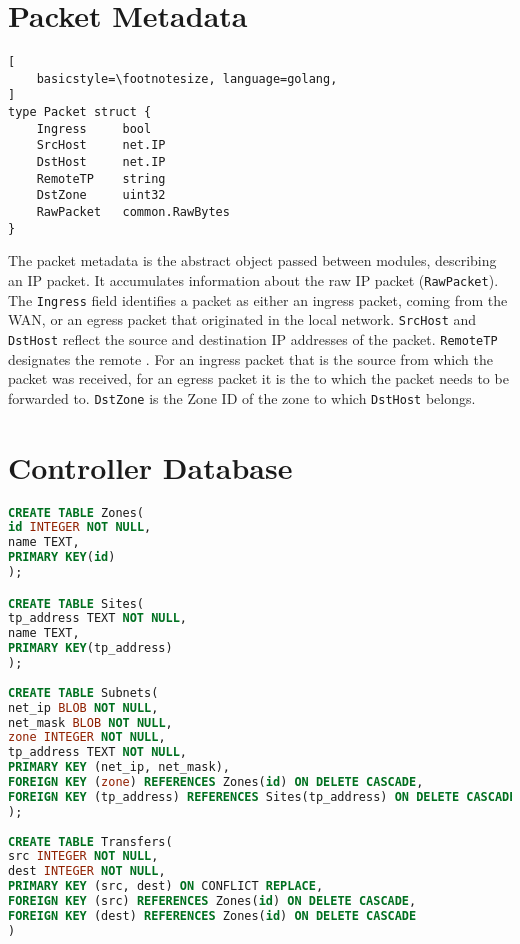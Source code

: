 \chapter{Packet Metadata}
\label{apdx:meta}


\begin{lstlisting}[
	basicstyle=\footnotesize, language=golang,
]
type Packet struct {
	Ingress		bool
	SrcHost 	net.IP
	DstHost 	net.IP
	RemoteTP	string
	DstZone		uint32
	RawPacket 	common.RawBytes
}
\end{lstlisting}

The packet metadata is the abstract object passed between modules, describing an IP packet.
It accumulates information about the raw IP packet (\texttt{RawPacket}). The \texttt{Ingress}
field identifies a packet as either an ingress packet, coming from the WAN, or an egress packet
that originated in the local network. \texttt{SrcHost} and \texttt{DstHost} reflect the source
and destination IP addresses of the packet. \texttt{RemoteTP} designates the remote \tp. For an
ingress packet that is the source \tp from which the packet was received, for an egress packet
it is the \tp to which the packet needs to be forwarded to. \texttt{DstZone} is the Zone ID of
the zone to which \texttt{DstHost} belongs.

\chapter{Controller Database}
\label{apdx:controllerdb}


\begin{lstlisting}[language=sql, basicstyle=\tiny, %or \small or \footnotesize etc.
]
CREATE TABLE Zones(
id INTEGER NOT NULL,
name TEXT,
PRIMARY KEY(id)
);

CREATE TABLE Sites(
tp_address TEXT NOT NULL,
name TEXT,
PRIMARY KEY(tp_address)
);
	  
CREATE TABLE Subnets(
net_ip BLOB NOT NULL,
net_mask BLOB NOT NULL,
zone INTEGER NOT NULL,
tp_address TEXT NOT NULL,
PRIMARY KEY (net_ip, net_mask),
FOREIGN KEY (zone) REFERENCES Zones(id) ON DELETE CASCADE,
FOREIGN KEY (tp_address) REFERENCES Sites(tp_address) ON DELETE CASCADE
);
	  
CREATE TABLE Transfers(
src INTEGER NOT NULL,
dest INTEGER NOT NULL,
PRIMARY KEY (src, dest) ON CONFLICT REPLACE,
FOREIGN KEY (src) REFERENCES Zones(id) ON DELETE CASCADE,
FOREIGN KEY (dest) REFERENCES Zones(id) ON DELETE CASCADE	
)
\end{lstlisting}


